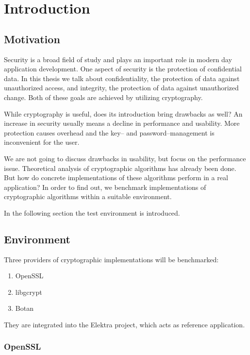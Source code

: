\chapter{Introduction}

\section{Motivation}

Security is a broad field of study and plays an important role in modern day application development.
One aspect of security is the protection of confidential data.
In this thesis we talk about confidentiality, the protection of data against unauthorized access, and integrity, the protection of data against unauthorized change.
Both of these goals are achieved by utilizing cryptography.

While cryptography is useful, does its introduction bring drawbacks as well?
An increase in security usually means a decline in performance and usability.
More protection causes overhead and the key-- and password--management is inconvenient for the user.

We are not going to discuss drawbacks in usability, but focus on the performance issue.
Theoretical analysis of cryptographic algorithms has already been done. 
But how do concrete implementations of these algorithms perform in a real application?
In order to find out, we benchmark implementations of cryptographic algorithms within a suitable environment.

In the following section the test environment is introduced.

\section{Environment}

Three providers of cryptographic implementations will be benchmarked:

\begin{enumerate}
\item OpenSSL
\item libgcrypt
\item Botan
\end{enumerate}

They are integrated into the Elektra project, which acts as reference application.

	\subsection{OpenSSL}

